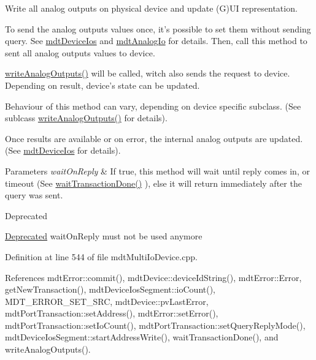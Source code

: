 Write all analog outputs on physical device and update (G)U\-I representation. 

To send the analog outputs values once, it's possible to set them without sending query. See \hyperlink{classmdt_device_ios}{mdt\-Device\-Ios} and \hyperlink{classmdt_analog_io}{mdt\-Analog\-Io} for details. Then, call this method to sent all analog outputs values to device.

\hyperlink{classmdt_multi_io_device_ac6b1b24b8c3eb0722df4079df11e6b71}{write\-Analog\-Outputs()} will be called, witch also sends the request to device. Depending on result, device's state can be updated.

Behaviour of this method can vary, depending on device specific subclass. (See sublcass \hyperlink{classmdt_multi_io_device_ac6b1b24b8c3eb0722df4079df11e6b71}{write\-Analog\-Outputs()} for details).

Once results are available or on error, the internal analog outputs are updated. (See \hyperlink{classmdt_device_ios}{mdt\-Device\-Ios} for details).


\begin{DoxyParams}{Parameters}
{\em wait\-On\-Reply} & If true, this method will wait until reply comes in, or timeout (See \hyperlink{classmdt_multi_io_device_a37a3f39a36b3bbd383f4f704193e3955}{wait\-Transaction\-Done()} ), else it will return immediately after the query was sent.\\
\hline
\end{DoxyParams}
\begin{DoxyRefDesc}{Deprecated}
\item[\hyperlink{deprecated__deprecated000013}{Deprecated}]wait\-On\-Reply must not be used anymore \end{DoxyRefDesc}


Definition at line 544 of file mdt\-Multi\-Io\-Device.\-cpp.



References mdt\-Error\-::commit(), mdt\-Device\-::device\-Id\-String(), mdt\-Error\-::\-Error, get\-New\-Transaction(), mdt\-Device\-Ios\-Segment\-::io\-Count(), M\-D\-T\-\_\-\-E\-R\-R\-O\-R\-\_\-\-S\-E\-T\-\_\-\-S\-R\-C, mdt\-Device\-::pv\-Last\-Error, mdt\-Port\-Transaction\-::set\-Address(), mdt\-Error\-::set\-Error(), mdt\-Port\-Transaction\-::set\-Io\-Count(), mdt\-Port\-Transaction\-::set\-Query\-Reply\-Mode(), mdt\-Device\-Ios\-Segment\-::start\-Address\-Write(), wait\-Transaction\-Done(), and write\-Analog\-Outputs().


